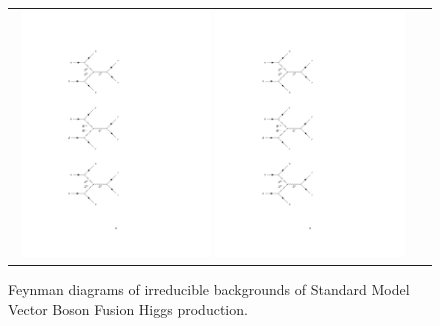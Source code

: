 \begin{figure}[tbh!]
	\centering
	\begin{tabular}{cc}
		\includegraphics[width=0.48\textwidth]{diagrams/pics/background_HZ0.pdf}
		\includegraphics[width=0.48\textwidth]{diagrams/pics/background_HW.pdf} 		
	\end{tabular}
	\caption{Feynman diagrams of irreducible backgrounds of Standard Model Vector Boson Fusion Higgs production. }
	\label{fig:background_SMVBFH}
\end{figure}

